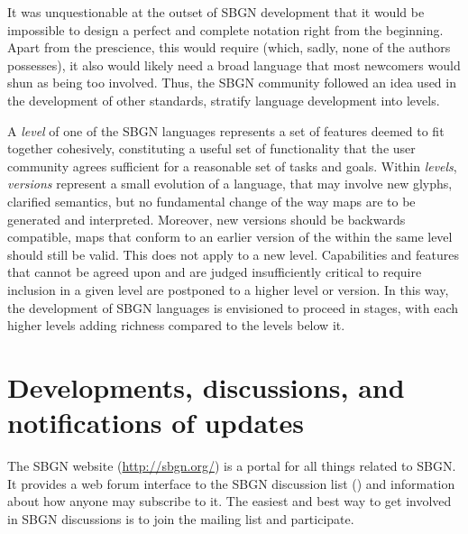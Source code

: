 It was unquestionable at the outset of SBGN development that it would be impossible 
to design a perfect and complete notation right from the beginning.  Apart 
from the prescience, this would require (which, sadly, none of the authors 
possesses), it also would likely need a broad language that most newcomers 
would shun as being too involved.  Thus, the SBGN community followed an idea 
used in the development of other standards, \ie stratify language 
development into levels.

A \emph{level} of one of the SBGN languages represents a set of features 
deemed to fit together cohesively, constituting a useful set of 
functionality that the user community agrees sufficient for a reasonable 
set of tasks and goals. Within \emph{levels}, \emph{versions} represent 
a small evolution of a language, that may involve new glyphs, clarified 
semantics, but no fundamental change of the way maps are to be generated 
and interpreted. Moreover, new versions should be backwards compatible, 
\ie \PD maps that conform to an earlier version of the \PDl within 
the same level should still be valid. This does not apply to a new level.
Capabilities and features that cannot be agreed upon and 
are judged insufficiently critical to require inclusion in a given level 
are postponed to a higher level or version.  In this way, the development 
of SBGN languages is envisioned to proceed in stages, with each higher 
levels adding richness compared to the levels below it.

\section{Developments, discussions, and notifications of updates}
\label{sec:discussions}

The SBGN website (\url{http://sbgn.org/}) is a portal for all things 
related to SBGN.  It provides a web forum interface to the SBGN discussion 
list () and information about how anyone 
may subscribe to it.  The easiest and best way to get involved in SBGN 
discussions is to join the mailing list and participate.

